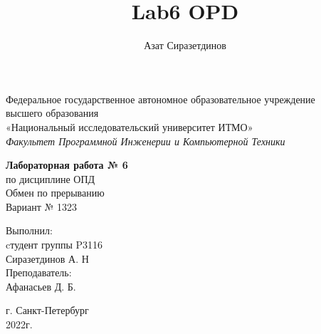 \documentclass[12pt]{article}
\title{Lab6 OPD}
\author{Азат Сиразетдинов}
\begin{document}
	\thispagestyle{empty}
	\begin{center}
		Федеральное государственное автономное образовательное учреждение\\ 
		высшего образования\\
		«Национальный исследовательский университет ИТМО»\\
		\textit{Факультет Программной Инженерии и Компьютерной Техники}\\
	\end{center}
	\vspace{2cm}
	\begin{center}
		\large
		\textbf{Лабораторная работа № 6}\\
		по дисциплине ОПД\\
		Обмен по прерыванию\\
		Вариант № 1323
	\end{center}
	\vspace{7cm}
	\begin{flushright}
		Выполнил:\\
		cтудент  группы P3116\\
		Сиразетдинов А. Н\\
		Преподаватель: \\
		Афанасьев Д. Б.\\
	\end{flushright}
	\vspace{6cm}
	\begin{center}
		г. Санкт-Петербург\\
		2022г.
	\end{center}
	\newpage
	
	\tableofcontents
	\newpage
	
	
\end{document}
